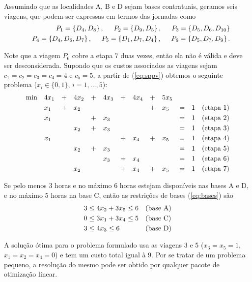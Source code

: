 Assumindo que as localidades A, B e D sejam bases contratuais, geramos seis viagens, que podem ser
expressas em termos das jornadas como 
%
\begin{eqnarray*}
	&& P_1 = \{D_4, D_8\} \, , \hspace{0.5cm} P_2 = \{D_9, D_5\} \, , \hspace{0.5cm} P_3 = \{D_5, D_6, D_{10}\} \\
	&& P_4 = \{D_4, D_6, D_7\} \, , \hspace{0.5cm} P_5 = \{D_1, D_7, D_4\} \, , \hspace{0.5cm} P_6 = \{D_5, D_7, D_9\} \, . 
\end{eqnarray*}

Note que a viagem $P_6$ cobre a etapa $7$ duas vezes, então ela não é válida e deve ser 
desconsiderada. Supondo que os custos associados as viagens sejam $c_1 = c_2 = c_3 = c_4 = 4$ e
$c_5 = 5$, a partir de (\ref{eq:sppv}) obtemos o seguinte problema ($x_i \in \{0, 1\}$, 
$i=1, \ldots, 5$):
%
\begin{equation*}
	\begin{array}{lllllllllllll}
		\text{min} & 4x_1 & + & 4x_2 & + & 4x_3 & + & 4x_4 & + & 5 x_5 & & & \vsp \\ 
		& x_1 & + & x_2 & & & & & + & x_5 & = & 1 & \text{(etapa 1)} \vsp \\
		& x_1 & & & + & x_3 & & & & & = & 1 & \text{(etapa 2)} \vsp \\
		& & & x_2 & + & x_3 & & & & & = & 1 & \text{(etapa 3)} \vsp \\
		& x_1 & & & & & + & x_4 & + & x_5 & = & 1 & \text{(etapa 4)} \vsp \\
		& & & x_2 & + & x_3 & & & & & = & 1 & \text{(etapa 5)} \vsp \\
		& & & & & x_3 & + & x_4 & & & = & 1 & \text{(etapa 6)} \vsp \\
		& & & x_2 & & & + & x_4 & + & x_5 & = & 1 & \text{(etapa 7)}
	\end{array}
\end{equation*}

Se pelo menos 3 horas e no máximo 6 horas estejam disponíveis nas bases A e D, e no máximo 5 horas 
na base C, então as restrições de bases (\ref{eq:bases}) são
%
\begin{equation*}
	\begin{array}{ll}
		3 \leq 4 x_2 + 3 x_5 \leq 6 & \text{(base A)} \vsp \\
		0 \leq 3 x_1 + 3 x_4 \leq 5 & \text{(base C)} \vsp \\
		3 \leq 4 x_3 \leq 6 & \text{(base D)}
	\end{array}
\end{equation*}

A solução ótima para o problema formulado usa as viagens 3 e 5 ($x_3 = x_5 = 1$, 
$x_1 = x_2 = x_4 =  0$) e tem um custo total igual à 9. Por se tratar de um problema pequeno, a
resolução do mesmo pode ser obtido por qualquer pacote de otimização linear.

